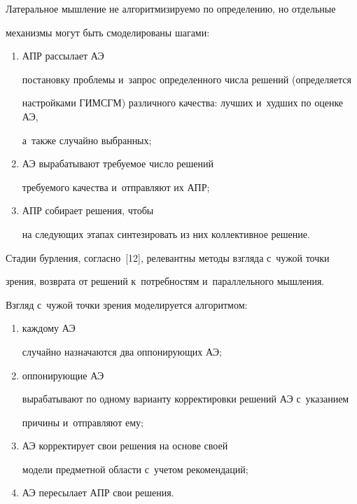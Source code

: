   


  Латеральное мышление не алгоритмизируемо по определению, но отдельные 


механизмы могут быть смоделированы шагами: 


\begin{enumerate}[(1)]


\item АПР рассылает АЭ 


постановку проблемы и~запрос определенного числа решений (определяется 


настройками ГИМСГМ) различного качества: лучших и~худших по оценке АЭ, 


а~также случайно выбранных;\\[-10pt]  


\item АЭ вырабатывают требуемое число решений 


требуемого качества и~от\-прав\-ля\-ют их АПР;\\[-10pt]  


\item АПР собирает решения, чтобы 


на следующих этапах синтезировать из них коллективное решение.


  \end{enumerate}


  


  Стадии бурления, согласно~[12], релевантны методы взгляда с~чужой точки 


зрения, возврата от решений к~потребностям и~параллельного мышления. 





\pagebreak


  


  Взгляд с~чужой точки зрения моделируется алгоритмом: 


  \begin{enumerate}[(1)]


  \item каждому АЭ 


случайно назначаются два оппонирующих АЭ; 


\item оппонирующие АЭ 


вырабатывают по одному варианту корректировки решений АЭ с~указанием 


причины и~отправляют ему; 


\item АЭ корректирует свои решения на основе своей 


модели предметной области с~учетом рекомендаций; 


\item АЭ пересылает АПР  свои решения.


\end{enumerate}


